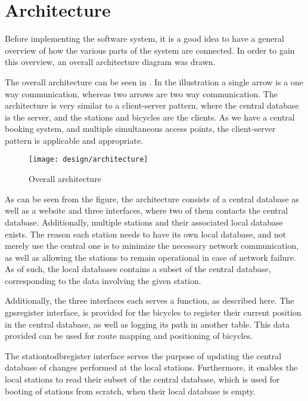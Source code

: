 \section{Architecture}
Before implementing the software system, it is a good idea to have a general overview of how the various parts of the system are connected.
In order to gain this overview, an overall architecture diagram was drawn.

The overall architecture can be seen in .
In the illustration a single arrow is a one way communication, whereas two arrows are two way communication.
The architecture is very similar to a client-server pattern, where the central database is the server, and the stations and bicycles are the clients.
As we have a central booking system, and multiple simultaneous access points, the client-server pattern is applicable and appropriate.

\begin{figure}[h]
	\centering
	\texttt{[image: design/architecture]}
	\caption{Overall architecture}\label{fig:overallarch}
\end{figure}

As can be seen from the figure, the architecture consists of a central database as well as a website and three interfaces, where two of them contacts the central database.
Additionally, multiple stations and their associated local database exists.
The reason each station needs to have its own local database, and not merely use the central one is to minimize the necessary network communication, as well as allowing the stations to remain operational in case of network failure.
As of such, the local databases contains a subset of the central database, corresponding to the data involving the given station.

Additionally, the three interfaces each serves a function, as described here.
The gpsregister interface, is provided for the bicycles to register their current position in the central database, as well as logging its path in another table.
This data provided can be used for route mapping and positioning of bicycles.

The stationtodbregister interface serves the purpose of updating the central database of changes performed at the local stations. Furthermore, it enables the local stations to read their subset of the central database, which is used for booting of stations from scratch, when their local database is empty.

